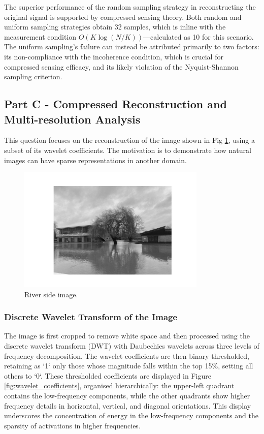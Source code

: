 \documentclass[11pt]{article}
\begin{document}
The superior performance of the random sampling strategy in reconstructing the original signal is supported by compressed sensing theory. Both random and uniform sampling strategies obtain 32 samples, which is inline with the measurement condition \(O(K \log(N/K))\)—calculated as 10 for this scenario. The uniform sampling's failure can instead be attributed primarily to two factors: its non-compliance with the incoherence condition, which is crucial for compressed sensing efficacy, and its likely violation of the Nyquist-Shannon sampling criterion.

\subsection{Part C - Compressed Reconstruction and Multi-resolution Analysis}
This question focuses on the reconstruction of the image shown in Fig \ref{fig:river_side}, using a subset of its wavelet coefficients. The motivation is to demonstrate how natural images can have sparse representations in another domain.
\begin{figure}[H]
    \centering
    \includegraphics[width=0.8\textwidth]{../data/river_side.jpeg}
    \caption{River side image.}
    \label{fig:river_side}
\end{figure}

\subsubsection{Discrete Wavelet Transform of the Image}
The image is first cropped to remove white space and then processed using the discrete wavelet transform (DWT) with Daubechies wavelets across three levels of frequency decomposition. The wavelet coefficients are then binary thresholded, retaining as `1` only those whose magnitude falls within the top 15\%, setting all others to `0`. These thresholded coefficients are displayed in Figure \ref{fig:wavelet_coefficients}, organised hierarchically: the upper-left quadrant contains the low-frequency components, while the other quadrants show higher frequency details in horizontal, vertical, and diagonal orientations. This display underscores the concentration of energy in the low-frequency components and the sparsity of activations in higher frequencies.
\end{document}
